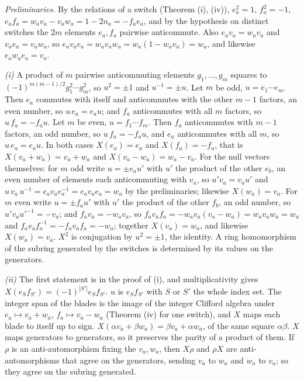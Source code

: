 \emph{Preliminaries.} By the relations of a switch (Theorem (i), (iv)), $e_{a}^{2} = 1$, $f_{a}^{2} = -1$, $e_{a}f_{a} = w_{a}v_{a} - v_{a}w_{a} = 1 - 2n_{a} = -f_{a}e_{a}$, and by the hypothesis on distinct switches the $2m$ elements $e_{a}, f_{a}$ pairwise anticommute. Also $e_{a}v_{a} = w_{a}v_{a}$ and $v_{a}e_{a} = v_{a}w_{a}$, so $e_{a}v_{a}e_{a} = w_{a}v_{a}w_{a} = w_{a}(1 - w_{a}v_{a}) = w_{a}$, and likewise $e_{a}w_{a}e_{a} = v_{a}$.

\emph{(i)} A product of $m$ pairwise anticommuting elements $g_{1}, \dots, g_{m}$ squares to $(-1)^{m(m-1)/2}g_{1}^{2}\cdots g_{m}^{2}$, so $u^{2} = \pm 1$ and $u^{-1} = \pm u$. Let $m$ be odd, $u = e_{1}\cdots e_{m}$. Then $e_{a}$ commutes with itself and anticommutes with the other $m - 1$ factors, an even number, so $u\,e_{a} = e_{a}u$; and $f_{a}$ anticommutes with all $m$ factors, so $u\,f_{a} = -f_{a}u$. Let $m$ be even, $u = f_{1}\cdots f_{m}$. Then $f_{a}$ anticommutes with $m - 1$ factors, an odd number, so $u\,f_{a} = -f_{a}u$, and $e_{a}$ anticommutes with all $m$, so $u\,e_{a} = e_{a}u$. In both cases $X(e_{a}) = e_{a}$ and $X(f_{a}) = -f_{a}$, that is $X(v_{a} + w_{a}) = v_{a} + w_{a}$ and $X(v_{a} - w_{a}) = w_{a} - v_{a}$. For the null vectors themselves: for $m$ odd write $u = \pm e_{a}u'$ with $u'$ the product of the other $e_{b}$, an even number of elements each anticommuting with $v_{a}$, so $u'v_{a} = v_{a}u'$ and $u\,v_{a}\,u^{-1} = e_{a}v_{a}e_{a}^{-1} = e_{a}v_{a}e_{a} = w_{a}$ by the preliminaries; likewise $X(w_{a}) = v_{a}$. For $m$ even write $u = \pm f_{a}u'$ with $u'$ the product of the other $f_{b}$, an odd number, so $u'v_{a}u'^{-1} = -v_{a}$; and $f_{a}v_{a} = -w_{a}v_{a}$, so $f_{a}v_{a}f_{a} = -w_{a}v_{a}(v_{a} - w_{a}) = w_{a}v_{a}w_{a} = w_{a}$ and $f_{a}v_{a}f_{a}^{-1} = -f_{a}v_{a}f_{a} = -w_{a}$; together $X(v_{a}) = w_{a}$, and likewise $X(w_{a}) = v_{a}$. $X^{2}$ is conjugation by $u^{2} = \pm 1$, the identity. A ring homomorphism of the subring generated by the switches is determined by its values on the generators.

\emph{(ii)} The first statement is in the proof of (i), and multiplicativity gives $X(e_{S}f_{S'}) = (-1)^{|S'|}e_{S}f_{S'}$. $u$ is $e_{S}f_{S'}$ with $S$ or $S'$ the whole index set. The integer span of the blades is the image of the integer Clifford algebra under $e_{a} \mapsto v_{a} + w_{a}$, $f_{a} \mapsto v_{a} - w_{a}$ (Theorem (iv) for one switch), and $X$ maps each blade to itself up to sign. $X(\alpha v_{a} + \beta w_{a}) = \beta v_{a} + \alpha w_{a}$, of the same square $\alpha\beta$. $X$ maps generators to generators, so it preserves the parity of a product of them. If $\rho$ is an anti-automorphism fixing the $v_{a}, w_{a}$, then $X\rho$ and $\rho X$ are anti-automorphisms that agree on the generators, sending $v_{a}$ to $w_{a}$ and $w_{a}$ to $v_{a}$; so they agree on the subring generated.

